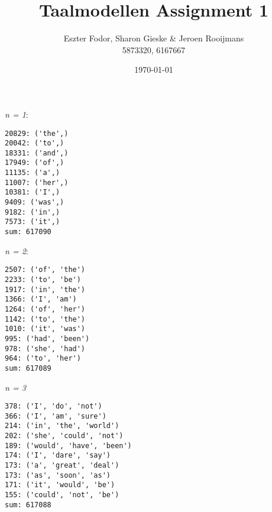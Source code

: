 \documentclass[11pt, a4paper]{article}
\title{Taalmodellen Assignment 1}
\author{Eszter Fodor, Sharon Gieske \& Jeroen Rooijmans \\ 5873320, 6167667}
\date{\today}
\begin{document}
\maketitle

\noindent \textit{n = 1}:
\begin{verbatim}
20829: ('the',)
20042: ('to',)
18331: ('and',)
17949: ('of',)
11135: ('a',)
11007: ('her',)
10381: ('I',)
9409: ('was',)
9182: ('in',)
7573: ('it',)
sum: 617090
\end{verbatim}

\noindent \textit{n = 2}:
\begin{verbatim}
2507: ('of', 'the')
2233: ('to', 'be')
1917: ('in', 'the')
1366: ('I', 'am')
1264: ('of', 'her')
1142: ('to', 'the')
1010: ('it', 'was')
995: ('had', 'been')
978: ('she', 'had')
964: ('to', 'her')
sum: 617089
\end{verbatim}

\noindent \textit{n = 3}
\begin{verbatim}
378: ('I', 'do', 'not')
366: ('I', 'am', 'sure')
214: ('in', 'the', 'world')
202: ('she', 'could', 'not')
189: ('would', 'have', 'been')
174: ('I', 'dare', 'say')
173: ('a', 'great', 'deal')
173: ('as', 'soon', 'as')
171: ('it', 'would', 'be')
155: ('could', 'not', 'be')
sum: 617088
\end{verbatim}
\end{document}
